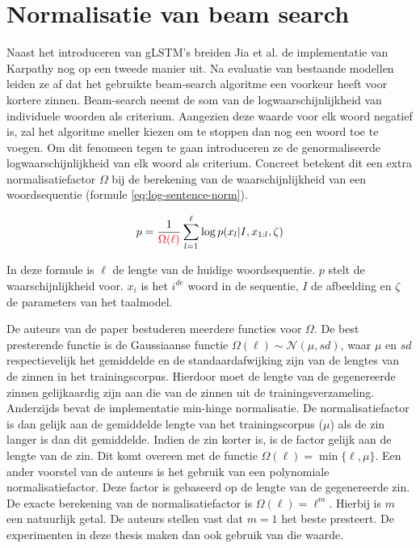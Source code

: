 \section{Normalisatie van beam search}
Naast het introduceren van gLSTM's breiden Jia et al.\cite{Fernando2015} de implementatie van Karpathy nog op een tweede manier uit. Na evaluatie van bestaande modellen leiden ze af dat het gebruikte beam-search algoritme een voorkeur heeft voor kortere zinnen. Beam-search neemt de som van de logwaarschijnlijkheid van individuele woorden als criterium. Aangezien deze waarde voor elk woord negatief is, zal het algoritme sneller kiezen om te stoppen dan nog een woord toe te voegen. Om dit fenomeen tegen te gaan introduceren ze de genormaliseerde logwaarschijnlijkheid van elk woord als criterium. Concreet betekent dit een extra normalisatiefactor $\Omega$ bij de berekening van de waarschijnlijkheid van een woordsequentie (formule \eqref{eq:log-sentence-norm}).

\begin{equation}
p = \frac{1}{\color{red}{\Omega(\ell)}}\sum_{l=1}^{\ell} \log p(x_l | I, x_{1:l}, \zeta)
\label{eq:log-sentence-norm}
\end{equation}

In deze formule is $\ell$ de lengte van de huidige woordsequentie. $p$ stelt de waarschijnlijkheid voor. $x_i$ is het $i^{de}$ woord in de sequentie, $I$ de afbeelding en $\zeta$ de parameters van het taalmodel. 

De auteurs van de paper bestuderen meerdere functies voor $\Omega$. 
De best presterende functie is de Gaussiaanse functie $\Omega(\ell) \sim \mathcal{N}(\mu, sd)$, waar $\mu$ en $sd$ respectievelijk het gemiddelde en de standaardafwijking zijn van de lengtes van de zinnen in het trainingscorpus. Hierdoor moet de lengte van de gegenereerde zinnen gelijkaardig zijn aan die van de zinnen uit de trainingsverzameling. 
Anderzijds bevat de implementatie min-hinge normalisatie. De normalisatiefactor is dan gelijk aan de gemiddelde lengte van het trainingscorpus ($\mu$) als de zin langer is dan dit gemiddelde. Indien de zin korter is, is de factor gelijk aan de lengte van de zin. Dit komt overeen met de functie $\Omega(\ell)=\min\{\ell, \mu\}$.
Een ander voorstel van de auteurs is het gebruik van een polynomiale normalisatiefactor. Deze factor is gebaseerd op de lengte van de gegenereerde zin. De exacte berekening van de normalisatiefactor is $\Omega(\ell) = \ell^m$. Hierbij is $m$ een natuurlijk getal. De auteurs stellen vast dat $m=1$ het beste presteert. De experimenten in deze thesis maken dan ook gebruik van die waarde.

